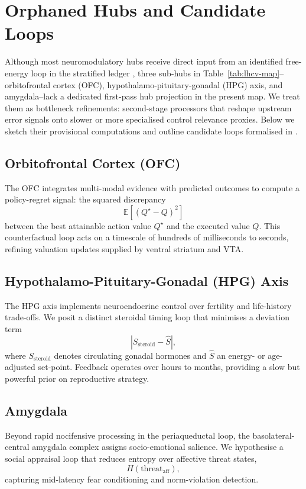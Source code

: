 \documentclass[11pt]{article}
\begin{document}
\section{Orphaned Hubs and Candidate Loops}

Although most neuromodulatory hubs receive direct input from an identified free-energy loop in the stratified ledger \cite{zarncke2025stratification}, three sub-hubs in Table~\ref{tab:lhcv-map}--orbitofrontal cortex (OFC), hypothalamo-pituitary-gonadal (HPG) axis, and amygdala--lack a dedicated first-pass hub projection in the present map. We treat them as bottleneck refinements: second-stage processors that reshape upstream error signals onto slower or more specialised control relevance proxies. Below we sketch their provisional computations and outline candidate loops formalised in \citealp{zarncke2025stratification}.

\subsection{Orbitofrontal Cortex (OFC)}

The OFC integrates multi-modal evidence with predicted outcomes to compute a policy-regret signal: the squared discrepancy
\[
  \mathbb{E}\left[(Q^\star - Q)^2\right]
\]
between the best attainable action value $Q^\star$ and the executed value $Q$. This counterfactual loop acts on a timescale of hundreds of milliseconds to seconds, refining valuation updates supplied by ventral striatum and VTA.

\subsection{Hypothalamo-Pituitary-Gonadal (HPG) Axis}

The HPG axis implements neuroendocrine control over fertility and life-history trade-offs. We posit a distinct steroidal timing loop that minimises a deviation term
\[
  \left|S_{\mathrm{steroid}} - \hat{S}\right|,
\]
where $S_{\mathrm{steroid}}$ denotes circulating gonadal hormones and $\hat{S}$ an energy- or age-adjusted set-point. Feedback operates over hours to months, providing a slow but powerful prior on reproductive strategy.

\subsection{Amygdala}

Beyond rapid nocifensive processing in the periaqueductal loop, the basolateral-central amygdala complex assigns socio-emotional salience. We hypothesise a social appraisal loop that reduces entropy over affective threat states,
\[
  H\left(\mathrm{threat}_{\mathrm{aff}}\right),
\]
capturing mid-latency fear conditioning and norm-violation detection.
\end{document}
